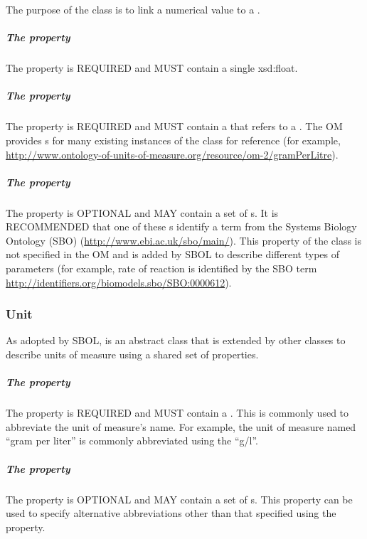 The purpose of the  class is to link a numerical value to a . 

\subparagraph{The  property}\label{sec:hasNumericalValue}
The  property is REQUIRED and MUST contain a single xsd:float.

\subparagraph{The  property}\label{sec:hasUnit:Measure}
The  property is REQUIRED and MUST contain a  that refers to a . The OM provides s for many existing instances of the  class for reference (for example, \url{http://www.ontology-of-units-of-measure.org/resource/om-2/gramPerLitre}).

\subparagraph{The  property}\label{sec:types:Measure}
The  property is OPTIONAL and MAY contain a set of s. It is RECOMMENDED that one of these s identify a term from the Systems Biology Ontology (SBO) (\url{http://www.ebi.ac.uk/sbo/main/}). This  property of the  class is not specified in the OM and is added by SBOL to describe different types of parameters (for example, rate of reaction is identified by the SBO term \url{http://identifiers.org/biomodels.sbo/SBO:0000612}).

\subsubsection{Unit}
\label{sec:Unit}

As adopted by SBOL,  is an abstract class that is extended by other classes to describe units of measure using a shared set of properties. 

\subparagraph{The  property}\label{sec:symbol:Unit}
The  property is REQUIRED and MUST contain a . This  is commonly used to abbreviate the unit of measure's name. For example, the unit of measure named ``gram per liter'' is commonly abbreviated using the  ``g/l''.

\subparagraph{The  property}\label{sec:alternativeSymbols:Unit}
The  property is OPTIONAL and MAY contain a set of s. This property can be used to specify alternative abbreviations other than that specified using the  property.

